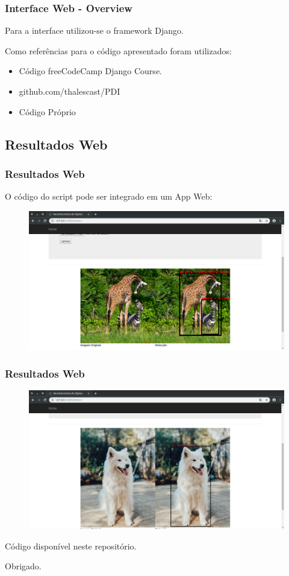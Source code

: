 \documentclass{beamer}
\begin{document}
	\begin{frame}
	\frametitle{Interface Web - Overview}
		Para a interface utilizou-se o framework Django.
		
		Como referências para o código apresentado foram utilizados:
		
		\vspace{1cm}
		
		\begin{itemize}
			\item Código freeCodeCamp Django Course.
			\item github.com/thalescast/PDI
			\item Código Próprio
		\end{itemize}
	\end{frame}

	
	\subsection{Resultados Web}
	\begin{frame}
	\frametitle{Resultados Web}
		O código do script pode ser integrado em um App Web:
		
	\begin{figure}
		\includegraphics[scale=0.2]{Imgs/giraffe_django}
	\end{figure}
	
\end{frame}
	
	
	\begin{frame}
	\frametitle{Resultados Web}

	
	\begin{figure}
		\includegraphics[scale=0.2]{Imgs/dog_django}
	\end{figure}
	
\end{frame}


\begin{frame}
	
	\begin{center}
		Código disponível neste repositório.
		
		Obrigado.
	\end{center}
	
\end{frame}
\end{document}
